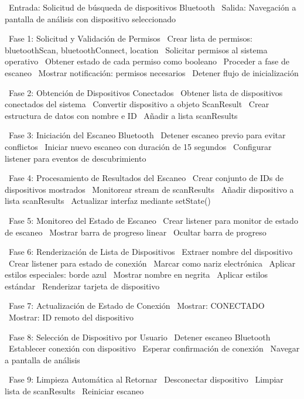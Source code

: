\begin{algorithmic}[1]
\State~Entrada: Solicitud de búsqueda de dispositivos Bluetooth
\State~Salida: Navegación a pantalla de análisis con dispositivo seleccionado

\State~Fase 1: Solicitud y Validación de Permisos
\State~Crear lista de permisos: bluetoothScan, bluetoothConnect, location
\State~Solicitar permisos al sistema operativo
\State~Obtener estado de cada permiso como booleano
    \State~Proceder a fase de escaneo
\Else%
    \State~Mostrar notificación: permisos necesarios
    \State~Detener flujo de inicialización
\EndIf%

\State~Fase 2: Obtención de Dispositivos Conectados
\State~Obtener lista de dispositivos conectados del sistema
    \State~Convertir dispositivo a objeto ScanResult
    \State~Crear estructura de datos con nombre e ID
    \State~Añadir a lista scanResults
\EndFor%

\State~Fase 3: Iniciación del Escaneo Bluetooth
\State~Detener escaneo previo para evitar conflictos
\State~Iniciar nuevo escaneo con duración de 15 segundos
\State~Configurar listener para eventos de descubrimiento

\State~Fase 4: Procesamiento de Resultados del Escaneo
\State~Crear conjunto de IDs de dispositivos mostrados
\State~Monitorear stream de scanResults
        \State~Añadir dispositivo a lista scanResults
    \EndIf%
\EndFor%
\State~Actualizar interfaz mediante setState() %

\State~Fase 5: Monitoreo del Estado de Escaneo
\State~Crear listener para monitor de estado de escaneo
    \State~Mostrar barra de progreso linear
\Else%
    \State~Ocultar barra de progreso
\EndIf%

\State~Fase 6: Renderización de Lista de Dispositivos
    \State~Extraer nombre del dispositivo
    \State~Crear listener para estado de conexión
        \State~Marcar como nariz electrónica
        \State~Aplicar estilos especiales: borde azul
        \State~Mostrar nombre en negrita
    \Else%
        \State~Aplicar estilos estándar
    \EndIf%
    \State~Renderizar tarjeta de dispositivo
\EndFor%

\State~Fase 7: Actualización de Estado de Conexión
        \State~Mostrar: CONECTADO
    \Else%
        \State~Mostrar: ID remoto del dispositivo
    \EndIf%
\EndFor%

\State~Fase 8: Selección de Dispositivo por Usuario
    \State~Detener escaneo Bluetooth
    \State~Establecer conexión con dispositivo
\EndIf%
\State~Esperar confirmación de conexión
\State~Navegar a pantalla de análisis

\State~Fase 9: Limpieza Automática al Retornar
    \State~Desconectar dispositivo
\EndFor%
\State~Limpiar lista de scanResults
\State~Reiniciar escaneo
\end{algorithmic}

